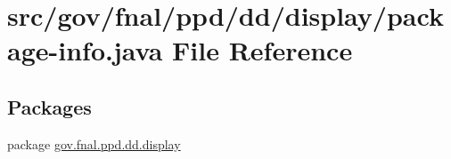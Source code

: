 \hypertarget{dd_2display_2package-info_8java}{\section{src/gov/fnal/ppd/dd/display/package-\/info.java File Reference}
\label{dd_2display_2package-info_8java}
}
\subsection*{Packages}
\begin{DoxyCompactItemize}
\item 
package \hyperlink{namespacegov_1_1fnal_1_1ppd_1_1dd_1_1display}{gov.\-fnal.\-ppd.\-dd.\-display}
\end{DoxyCompactItemize}
